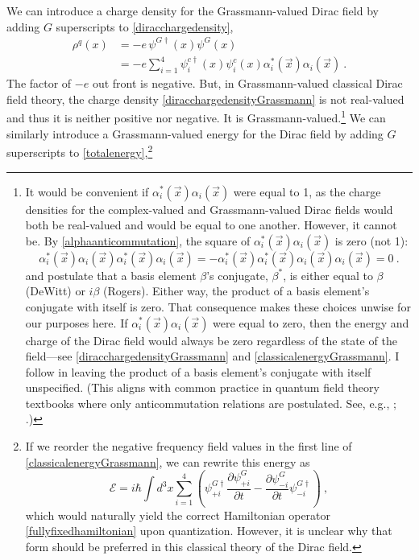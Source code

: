 \documentclass[12pt,secnumarabic,amsmath,amssymb,balancelastpage,nofootinbib]{article}
\begin{document}
We can introduce a charge density for the Grassmann-valued Dirac field by adding $G$ superscripts to \eqref{diracchargedensity},
\begin{align}
\rho^q(x)&=-e\, \psi^{G\dagger}(x) \psi^G(x)
\nonumber
\\
&= -e \sum_{i=1}^{4}\psi^{c\dagger}_i(x)\psi^c_i(x) \alpha^{*}_i(\vec{x})\alpha_i(\vec{x})   
\ .
\label{diracchargedensityGrassmann}
\end{align}
The factor of $-e$ out front is negative.  But, in Grassmann-valued classical Dirac field theory, the charge density \eqref{diracchargedensityGrassmann} is not real-valued and thus it is neither positive nor negative. It is Grassmann-valued.\footnote{It would be convenient if $\alpha_i^*(\vec{x})\alpha_i(\vec{x})$ were equal to 1, as the charge densities for the complex-valued and Grassmann-valued Dirac fields would both be real-valued and would be equal to one another.  However, it cannot be.  By \eqref{alphaanticommutation}, the square of $\alpha_i^*(\vec{x})\alpha_i(\vec{x})$ is zero (not 1):
\begin{equation}
\alpha_i^*(\vec{x})\alpha_i(\vec{x})\alpha_i^*(\vec{x})\alpha_i(\vec{x})=-\alpha_i^*(\vec{x})\alpha_i^*(\vec{x})\alpha_i(\vec{x})\alpha_i(\vec{x})=0
\ .
\end{equation}
\citet[pg.\ 6]{dewitt1992} and \citet[pg.\ 24]{rogers2007} postulate that a basis element $\beta$'s conjugate, $\beta^*$, is either equal to $\beta$ (DeWitt) or $i \beta$ (Rogers).  Either way, the product of a basis element's conjugate with itself is zero.  That consequence makes these choices unwise for our purposes here.  If $\alpha_i^*(\vec{x})\alpha_i(\vec{x})$ were equal to zero, then the energy and charge of the Dirac field would always be zero regardless of the state of the field---see \eqref{diracchargedensityGrassmann} and \eqref{classicalenergyGrassmann}.  I follow \citet[pg.\ 66--67]{berezin} in leaving the product of a basis element's conjugate with itself unspecified.  (This aligns with common practice in quantum field theory textbooks where only anticommutation relations are postulated.  See, e.g., \citealp[sec.\ 10.3.2]{duncan}; \citealp[sec.\ 14.6]{schwartz}.)}  We can similarly introduce a Grassmann-valued energy for the Dirac field by adding $G$ superscripts to \eqref{totalenergy},\footnote{If we reorder the negative frequency field values in the first line of \eqref{classicalenergyGrassmann}, we can rewrite this energy as
\begin{equation}
\mathcal{E}=i \hbar\int{d^3 x \sum_{i=1}^{4}  \left( \psi_{+i}^{G\dagger}\frac{\partial \psi^G_{+i}}{\partial t} - \frac{\partial \psi^G_{-i}}{\partial t}\psi_{-i}^{G\dagger}\right)}
\label{fullyfixedenergy}
\ ,
\end{equation}
which would naturally yield the correct Hamiltonian operator \eqref{fullyfixedhamiltonian} upon quantization.  However, it is unclear why that form should be preferred in this classical theory of the Dirac field.}
\end{document}
